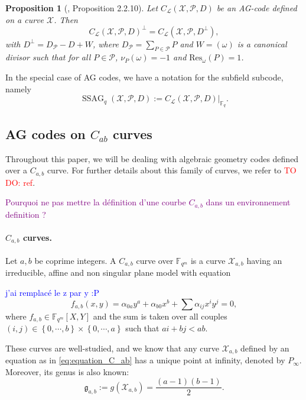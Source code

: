 \documentclass[a4paper]{article}
\newtheorem{proposition}[thm]{Proposition}
\theoremstyle{definition}
\theoremstyle{remark}
\newcommand{\calP}{\mathcal{P}}
\newcommand{\calL}{\mathcal{L}}
\newcommand{\calX}{\mathcal{X}}
\newcommand{\fqm}{\mathbb{F}_{q^m}}
\newcommand{\fq}{\mathbb{F}_{q}}
\newcommand{\set}[1]{\left\{#1\right\}}
\newcommand{\ssag}[1]{\operatorname{SSAG}_{q}\left(#1\right)}
\newcommand\jade[1]{\textcolor{purple}{#1}}
\newcommand\TODO[1]{\textcolor{red}{TO DO: #1}}
\newcommand\sabira[1]{\textcolor{blue}{#1}}
\begin{document}
\begin{proposition} [\cite{Sti09}, Proposition 2.2.10] \label{prop:dual_AG_codes}
Let $C_{\calL}(\calX,\calP,D)$ be an AG-code defined on a curve $\calX$. Then 
\[C_{\calL}(\calX,\calP,D)^{\perp} = C_{\calL}(\calX,\calP,D^{\perp}),\]
with $D^{\perp} = D_{\calP}-D+W$, where $D_{\calP} = \sum\limits_{P \in \calP} P$ and $W=(\omega)$ is a canonical divisor such that for all $P \in \calP$, $\nu_P(\omega)=-1$ and $\mathrm{Res}_{\omega}(P)=1$. 
\end{proposition}

\noindent In the special case of AG codes, we have a notation for the subfield subcode, namely
$$\ssag{\calX,\calP,D} := C_{\calL}(\calX,\calP,D)|_{\fq}.$$





\subsection{AG codes on $C_{ab}$ curves} \label{section:AG_codes}

Throughout this paper, we will be dealing with algebraic geometry codes defined over a $C_{a,b}$ curve. For further details about this family of curves, we refer to \TODO{ref}. 

\jade{Pourquoi ne pas mettre la définition d'une courbe $C_{a,b}$ dans un environnement definition ?}

\paragraph{$C_{a,b}$ curves.} Let $a,b$ be coprime integers. A $C_{a,b}$ curve over $\fqm$ is a curve $\calX_{a,b}$ having an irreducible, affine and non singular plane model with equation

\sabira{j'ai remplacé le z par y :P}
\begin{equation} \label{eq:equation_C_ab}
f_{a,b}(x,y) = \alpha_{0a}y^a + \alpha_{b0}x^b + \sum \alpha_{ij}x^iy^j = 0,
\end{equation}
where $f_{a,b} \in \fqm[X,Y]$ and the sum is taken over all couples $(i,j) \in \set{0,\cdots,b} \times \set{0,\cdots,a}$ such that $ai+bj < ab$. 

\noindent These curves are well-studied, and we know that any curve $\calX_{a,b}$ defined by an equation as in \eqref{eq:equation_C_ab} has a unique point at infinity, denoted by $P_{\infty}$. Moreover, its genus is also known:
\[\mathfrak{g}_{a,b}:=g(\calX_{a,b}) = \dfrac{(a-1)(b-1)}{2}.\]
\end{document}
